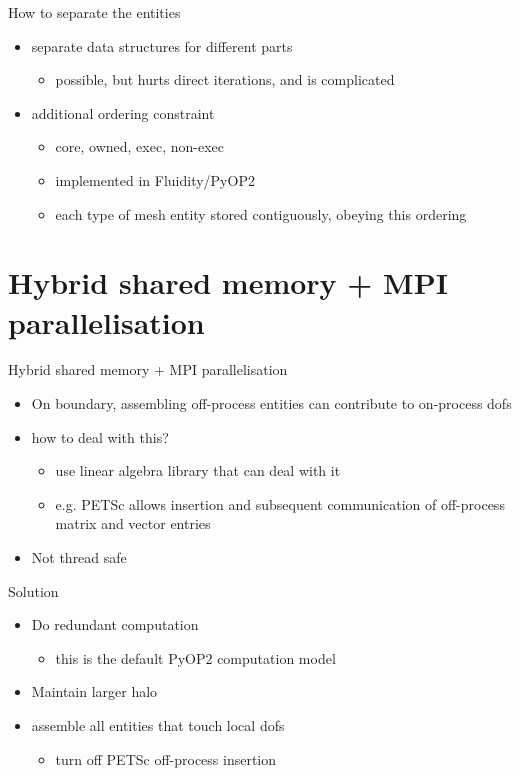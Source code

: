 \documentclass[presentation]{beamer}
\begin{document}
\begin{frame}[label={sec:orgheadline17}]{How to separate the entities}
\begin{itemize}
\item separate data structures for different parts
\begin{itemize}
\item possible, but hurts direct iterations, and is complicated
\end{itemize}

\item additional ordering constraint
\begin{itemize}
\item core, owned, exec, non-exec
\item implemented in Fluidity/PyOP2
\item each type of mesh entity stored contiguously, obeying this ordering
\end{itemize}
\end{itemize}
\end{frame}

\section{Hybrid shared memory + MPI parallelisation}
\label{sec:orgheadline27}

\begin{frame}[label={sec:orgheadline19}]{Hybrid shared memory + MPI parallelisation}
\begin{itemize}
\item On boundary, assembling off-process entities can contribute to on-process dofs
\item how to deal with this?
\begin{itemize}
\item use linear algebra library that can deal with it
\item e.g. PETSc allows insertion and subsequent communication of
off-process matrix and vector entries
\end{itemize}

\item Not thread safe
\end{itemize}
\end{frame}

\begin{frame}[label={sec:orgheadline20}]{Solution}
\begin{itemize}
\item Do redundant computation
\begin{itemize}
\item this is the default PyOP2 computation model
\end{itemize}
\item Maintain larger halo
\item assemble all entities that touch local dofs
\begin{itemize}
\item turn off PETSc off-process insertion
\end{itemize}
\end{itemize}
\end{frame}
\end{document}
